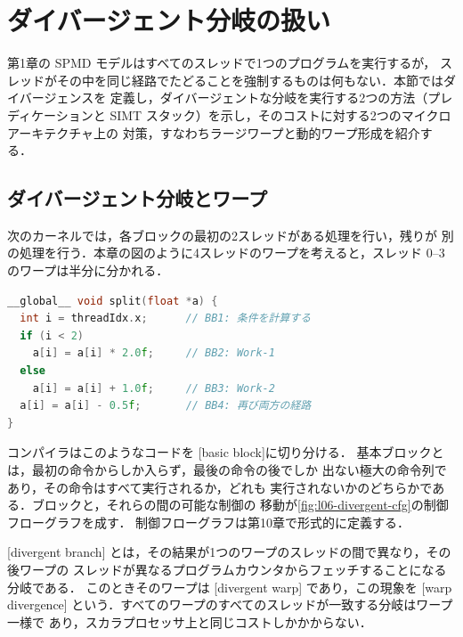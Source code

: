 \documentclass[../main.tex]{subfiles}
\begin{document}
\section{ダイバージェント分岐の扱い}
\label{sec:l06-divergence}

第1章の SPMD モデルはすべてのスレッドで1つのプログラムを実行するが，
スレッドがその中を同じ経路でたどることを強制するものは何もない．本節ではダイバージェンスを
定義し，ダイバージェントな分岐を実行する2つの方法（プレディケーションと
SIMT スタック）を示し，そのコストに対する2つのマイクロアーキテクチャ上の
対策，すなわちラージワープと動的ワープ形成を紹介する．

\subsection{ダイバージェント分岐とワープ}

次のカーネルでは，各ブロックの最初の2スレッドがある処理を行い，残りが
別の処理を行う．本章の図のように4スレッドのワープを考えると，スレッド
0--3のワープは半分に分かれる．

\begin{lstlisting}[language=C++, numbers=none]
__global__ void split(float *a) {
  int i = threadIdx.x;      // BB1: 条件を計算する
  if (i < 2)
    a[i] = a[i] * 2.0f;     // BB2: Work-1
  else
    a[i] = a[i] + 1.0f;     // BB3: Work-2
  a[i] = a[i] - 0.5f;       // BB4: 再び両方の経路
}
\end{lstlisting}

コンパイラはこのようなコードを
[basic block]に切り分ける．
基本ブロックとは，最初の命令からしか入らず，最後の命令の後でしか
出ない極大の命令列であり，その命令はすべて実行されるか，どれも
実行されないかのどちらかである．ブロックと，それらの間の可能な制御の
移動が\cref{fig:l06-divergent-cfg}の制御フローグラフを成す．
制御フローグラフは第10章で形式的に定義する．

\begin{definition}[ダイバージェント分岐とダイバージェントワープ]
  \label{def:l06-divergent}
  [divergent branch]
  とは，その結果が1つのワープのスレッドの間で異なり，その後ワープの
  スレッドが異なるプログラムカウンタからフェッチすることになる分岐である．
  このときそのワープは
  [divergent warp]
  であり，この現象を
  [warp divergence]
  という．すべてのワープのすべてのスレッドが一致する分岐はワープ一様で
  あり，スカラプロセッサ上と同じコストしかかからない．
\end{definition}
\end{document}
